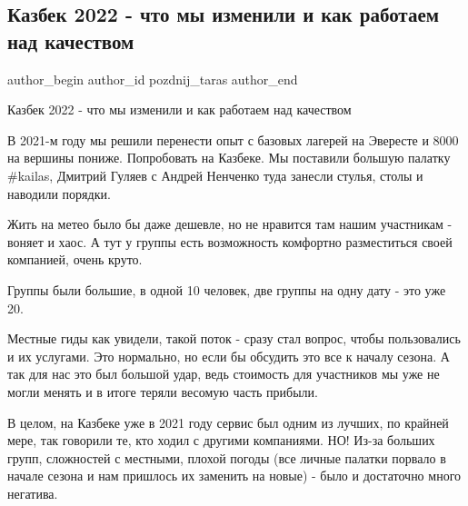  
 
 
 
 
 
\subsection{Казбек 2022 - что мы изменили и как работаем над качеством}
\label{sec:16_12_2021.fb.pozdnij_taras.1.kazbek}
 
\ifcmt
 author_begin
   author_id pozdnij_taras
 author_end
\fi

Казбек 2022 - что мы изменили и как работаем над качеством

В 2021-м году мы решили перенести  опыт с базовых лагерей на Эвересте и 8000 на
вершины пониже. Попробовать на Казбеке. Мы поставили большую палатку \#kailas,
Дмитрий Гуляев  с Андрей Ненченко туда занесли стулья, столы и наводили
порядки. 


Жить на метео было бы даже дешевле, но не нравится там нашим участникам -
воняет и хаос. А тут у группы есть возможность комфортно разместиться своей
компанией, очень круто. 

Группы были большие, в одной 10 человек, две группы на одну дату - это уже 20. 

Местные гиды как увидели, такой поток - сразу стал вопрос, чтобы пользовались и
их услугами. Это нормально, но если бы обсудить это все к началу сезона. А так
для нас это был большой удар, ведь стоимость для участников мы уже не могли
менять и в итоге теряли весомую часть прибыли. 


В целом, на Казбеке уже в 2021 году сервис был одним из лучших, по крайней
мере, так говорили те, кто ходил с другими компаниями. НО! Из-за больших групп,
сложностей с местными, плохой погоды (все личные палатки порвало в начале
сезона и нам пришлось их заменить на новые) - было и достаточно много негатива.


